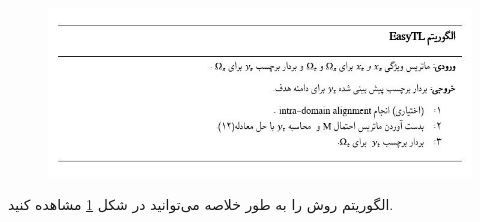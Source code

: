 {{{			\begin{figure}
				\centering
				\includegraphics[scale=0.7]{images/easyTLAlgo.JPG}
				\caption{}
				\label{fig:8}
			\end{figure}
			
			الگوریتم روش 
			را به طور خلاصه می‌توانید در شکل
			\ref{fig:8}
			مشاهده کنید.
		}
	}

}